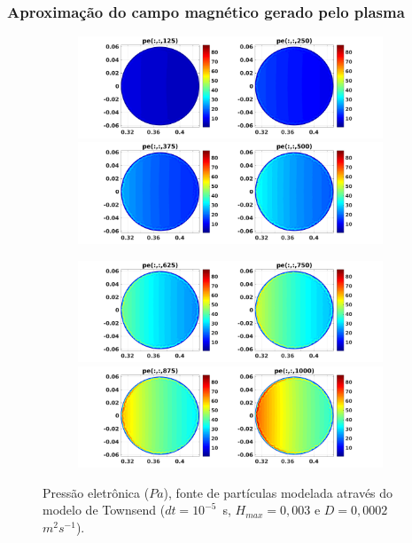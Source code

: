 \begin{frame}	
\frametitle{ Aproximação do campo magnético gerado pelo plasma}
\begin{figure}[H]
\begin{subfigure}{0.43\textwidth}
\includegraphics[scale=0.24]{../SImulacao_breakdown/PDE/petod1B9.png}  
\includegraphics[scale=0.24]{../SImulacao_breakdown/PDE/petod2B9.png}
\end{subfigure}
\begin{subfigure}{0.43\textwidth}
\includegraphics[scale=0.24]{../SImulacao_breakdown/PDE/petod3B9.png} 
\includegraphics[scale=0.24]{../SImulacao_breakdown/PDE/petod4B9.png}
\end{subfigure}	
\caption{Pressão eletrônica ($Pa$), fonte de partículas modelada através do modelo de Townsend ($dt=10^{-5}$\ s, $H_{max} = 0,003$ e $D=0,0002$\ $m^2s^{-1}$).}
\label{campplasmasil3}
\end{figure}
\end{frame}


